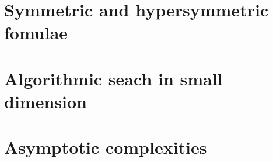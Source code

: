 \section{Symmetric and hypersymmetric fomulae}
\section{Algorithmic seach in small dimension}
\section{Asymptotic complexities}
